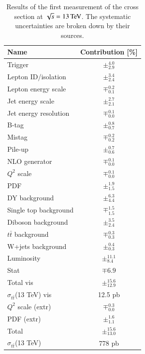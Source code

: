 \begin{table}[htbp!]
\begin{center}
\caption{Results of the first measurement of the \ttbar cross section at $\sqrt{s}= 13 \,\text{Te\hspace{-.08em}V}$. The systematic uncertainties are broken down by their sources.  }
\label{tab:res_ea}
\begin{tabular}{ l|c}
 \hline
Name  & Contribution [\%] \\ \hline
Trigger    & $\pm^{4.0}_{2.9}$ \\
Lepton ID/isolation    & $\pm^{3.4}_{2.4}$ \\
Lepton energy scale    & $\mp^{0.2}_{0.1}$ \\
Jet energy scale    & $\pm^{2.7}_{2.1}$ \\
Jet energy resolution    & $\mp^{0.1}_{0.0}$ \\
B-tag    & $\pm^{0.8}_{0.7}$ \\
Mistag    & $\mp^{0.2}_{0.2}$ \\
Pile-up    & $\pm^{0.7}_{0.6}$ \\
NLO generator    & $\mp^{0.1}_{0.0}$ \\
$Q^{2}$ scale    & $\mp^{0.1}_{0.0}$ \\
PDF    & $\pm^{1.9}_{1.5}$ \\
DY background    & $\pm^{6.3}_{4.4}$ \\
Single top background   & $\mp^{1.5}_{1.5}$ \\
Diboson background    & $\pm^{3.5}_{2.4}$ \\
$t\bar{t}$ background    & $\mp^{0.3}_{0.3}$ \\
W+jets background    & $\pm^{0.4}_{0.3}$ \\
Luminosity    & $\pm^{11.1}_{8.4}$ \\
Stat    & $\mp{6.9}$ \\
Total vis    & $\pm^{15.6}_{12.9}$ \\ \hline
$\sigma_{t\bar{t}}$(13 TeV) vis    & 12.5 pb \\ \hline
$Q^{2}$ scale (extr)    & $\mp^{0.3}_{0.0}$ \\
PDF (extr)    & $\pm^{1.6}_{1.1}$ \\ \hline
Total    & $\pm^{15.6}_{13.0}$ \\ \hline
$\sigma_{t\bar{t}}$(13 TeV)    & 778 pb \\ \hline \hline
\end{tabular}
\end{center}
\end{table}


